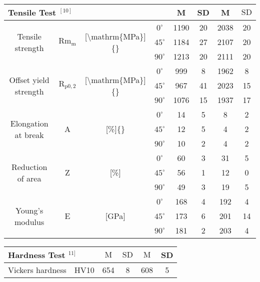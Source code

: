\documentclass[10pt]{article}
\begin{document}
\begin{center}
\begin{tabular}{|c|c|c|c|c|c|c|c|}
\hline
\multicolumn{4}{|l|}{Tensile Test ${ }^{[10]}$} & M & SD & M & $\mathrm{SD}$ \\
\hline
\multirow[t]{3}{*}{Tensile strength} & \multirow[t]{3}{*}{$\mathrm{Rm}_{\mathrm{m}}$} & \multirow[t]{3}{*}{[\textbackslash mathrm\{MPa\}]\{\}} & $0^{\circ}$ & 1190 & 20 & 2038 & 20 \\
\hline
 &  &  & $45^{\circ}$ & 1184 & 27 & 2107 & 20 \\
\hline
 &  &  & $90^{\circ}$ & 1213 & 20 & 2111 & 20 \\
\hline
\multirow[t]{3}{*}{Offset yield strength} & \multirow[t]{3}{*}{$\mathrm{R}_{\mathrm{p} 0,2}$} & \multirow[t]{3}{*}{[\textbackslash mathrm\{MPa\}]\{\}} & $0^{\circ}$ & 999 & 8 & 1962 & 8 \\
\hline
 &  &  & $45^{\circ}$ & 967 & 41 & 2023 & 15 \\
\hline
 &  &  & $90^{\circ}$ & 1076 & 15 & 1937 & 17 \\
\hline
\multirow[t]{3}{*}{Elongation at break} & \multirow[t]{3}{*}{A} & \multirow[t]{3}{*}{[\%]\{\}} & $0^{\circ}$ & 14 & 5 & 8 & 2 \\
\hline
 &  &  & $45^{\circ}$ & 12 & 5 & 4 & 2 \\
\hline
 &  &  & $90^{\circ}$ & 10 & 2 & 4 & 2 \\
\hline
\multirow[t]{3}{*}{Reduction of area} & \multirow[t]{3}{*}{Z} & \multirow[t]{3}{*}{[\%]} & $0^{\circ}$ & 60 & 3 & 31 & 5 \\
\hline
 &  &  & $45^{\circ}$ & 56 & 1 & 12 & 0 \\
\hline
 &  &  & $90^{\circ}$ & 49 & 3 & 19 & 5 \\
\hline
\multirow[t]{3}{*}{Young's modulus} & \multirow[t]{3}{*}{E} & \multirow[t]{3}{*}{[GPa]} & $0^{\circ}$ & 168 & 4 & 192 & 4 \\
\hline
 &  &  & $45^{\circ}$ & 173 & 6 & 201 & 14 \\
\hline
 &  &  & $90^{\circ}$ & 181 & 2 & 203 & 4 \\
\hline
\end{tabular}
\end{center}

\begin{center}
\begin{tabular}{|l|c|c|c|c|c|}
\hline
\multicolumn{2}{|l|}{Hardness Test $^{11]}$} & $\mathrm{M}$ & $\mathrm{SD}$ & $\mathrm{M}$ & SD \\
\hline
Vickers hardness & HV10 & 654 & 8 & 608 & 5 \\
\hline
\end{tabular}
\end{center}
\end{document}
